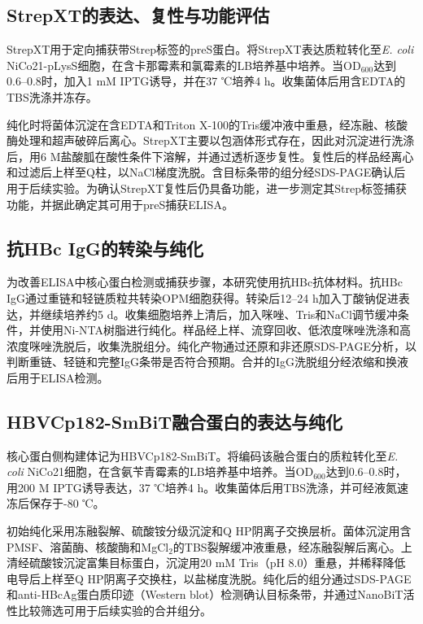 \subsection{StrepXT的表达、复性与功能评估}

StrepXT用于定向捕获带Strep标签的preS蛋白。将StrepXT表达质粒转化至\textit{E. coli} NiCo21-pLysS细胞，在含卡那霉素和氯霉素的LB培养基中培养。当OD$_{600}$达到0.6--0.8时，加入1 mM IPTG诱导，并在37 ℃培养4 h。收集菌体后用含EDTA的TBS洗涤并冻存。

纯化时将菌体沉淀在含EDTA和Triton X-100的Tris缓冲液中重悬，经冻融、核酸酶处理和超声破碎后离心。StrepXT主要以包涵体形式存在，因此对沉淀进行洗涤后，用6 M盐酸胍在酸性条件下溶解，并通过透析逐步复性。复性后的样品经离心和过滤后上样至Q柱，以NaCl梯度洗脱。含目标条带的组分经SDS-PAGE确认后用于后续实验。为确认StrepXT复性后仍具备功能，进一步测定其Strep标签捕获功能，并据此确定其可用于preS捕获ELISA。

\subsection{抗HBc IgG的转染与纯化}

为改善ELISA中核心蛋白检测或捕获步骤，本研究使用抗HBc抗体材料。抗HBc IgG通过重链和轻链质粒共转染OPM细胞获得。转染后12--24 h加入丁酸钠促进表达，并继续培养约5 d。收集细胞培养上清后，加入咪唑、Tris和NaCl调节缓冲条件，并使用Ni-NTA树脂进行纯化。样品经上样、流穿回收、低浓度咪唑洗涤和高浓度咪唑洗脱后，收集洗脱组分。纯化产物通过还原和非还原SDS-PAGE分析，以判断重链、轻链和完整IgG条带是否符合预期。合并的IgG洗脱组分经浓缩和换液后用于ELISA检测。

\subsection{HBVCp182-SmBiT融合蛋白的表达与纯化}

核心蛋白侧构建体记为HBVCp182-\allowbreak{}SmBiT。将编码该融合蛋白的质粒转化至\textit{E. coli} NiCo21细胞，在含氨苄青霉素的LB培养基中培养。当OD$_{600}$达到0.6--0.8时，用200 \textmu M IPTG诱导表达，37 ℃培养4 h。收集菌体后用TBS洗涤，并可经液氮速冻后保存于-80 ℃。

初始纯化采用冻融裂解、硫酸铵分级沉淀和Q HP阴离子交换层析。菌体沉淀用含PMSF、溶菌酶、核酸酶和MgCl$_2$的TBS裂解缓冲液重悬，经冻融裂解后离心。上清经硫酸铵沉淀富集目标蛋白，沉淀用20 mM Tris（pH 8.0）重悬，并稀释降低电导后上样至Q HP阴离子交换柱，以盐梯度洗脱。纯化后的组分通过SDS-PAGE和anti-HBcAg蛋白质印迹（Western blot）检测确认目标条带，并通过NanoBiT活性比较筛选可用于后续实验的合并组分。

